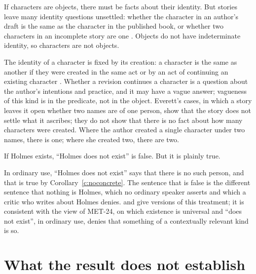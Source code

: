 \documentclass{situationist-preprint}
\begin{document}
\begin{objection}[Identity]
If characters are objects, there must be facts about their identity. But stories leave many identity questions unsettled: whether the character in an author's draft is the same as the character in the published book, or whether two characters in an incomplete story are one \citep{Everett2005}. Objects do not have indeterminate identity, so characters are not objects.
\end{objection}

\begin{reply}
The identity of a character is fixed by its creation: a character is the same as another if they were created in the same act or by an act of continuing an existing character \citep{Thomasson1999}. Whether a revision continues a character is a question about the author's intentions and practice, and it may have a vague answer; vagueness of this kind is in the predicate, not in the object. Everett's cases, in which a story leaves it open whether two names are of one person, show that the story does not settle what it ascribes; they do not show that there is no fact about how many characters were created. Where the author created a single character under two names, there is one; where she created two, there are two.
\end{reply}

\begin{objection}
If Holmes exists, \enquote{Holmes does not exist} is false. But it is plainly true.
\end{objection}

\begin{reply}
In ordinary use, \enquote{Holmes does not exist} says that there is no such person, and that is true by Corollary~\ref{c:noconcrete}. The sentence that is false is the different sentence that nothing is Holmes, which no ordinary speaker asserts and which a critic who writes about Holmes denies. \citet{Thomasson1999} and \citet{Kripke2013} give versions of this treatment; it is consistent with the view of MET-24, on which existence is universal and \enquote{does not exist}, in ordinary use, denies that something of a contextually relevant kind is so.
\end{reply}

\section{What the result does not establish}
\end{document}
